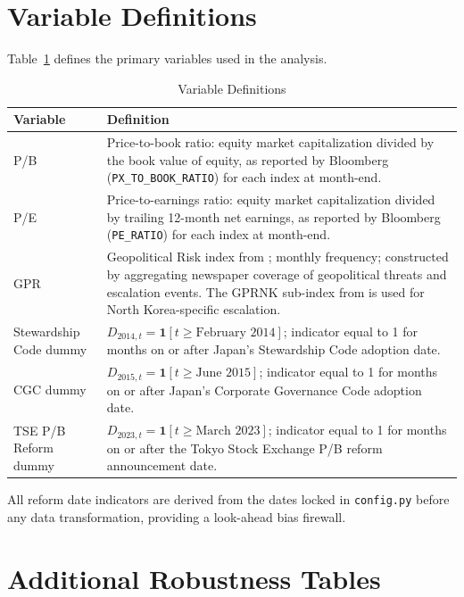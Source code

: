\documentclass[12pt]{article}
\begin{document}
\begin{appendices}

\section{Variable Definitions}
\label{app:vardefs}

Table~\ref{tab:vardefs} defines the primary variables used in the analysis.

\begin{table}[htbp]
\centering
\caption{Variable Definitions}
\label{tab:vardefs}
\begin{tabular}{lp{10cm}}
\toprule
Variable & Definition \\
\midrule
P/B & Price-to-book ratio: equity market capitalization divided by the book value of equity,
  as reported by Bloomberg (\texttt{PX\_TO\_BOOK\_RATIO}) for each index at month-end. \\
P/E & Price-to-earnings ratio: equity market capitalization divided by trailing 12-month net
  earnings, as reported by Bloomberg (\texttt{PE\_RATIO}) for each index at month-end. \\
GPR & Geopolitical Risk index from \citet{caldara2022}; monthly frequency; constructed by
  aggregating newspaper coverage of geopolitical threats and escalation events. The GPRNK
  sub-index from \citet{imf2021} is used for North Korea-specific escalation. \\
Stewardship Code dummy & $D_{2014,t} = \mathbf{1}[t \geq \text{February 2014}]$; indicator
  equal to 1 for months on or after Japan's Stewardship Code adoption date. \\
CGC dummy & $D_{2015,t} = \mathbf{1}[t \geq \text{June 2015}]$; indicator equal to 1 for
  months on or after Japan's Corporate Governance Code adoption date. \\
TSE P/B Reform dummy & $D_{2023,t} = \mathbf{1}[t \geq \text{March 2023}]$; indicator equal
  to 1 for months on or after the Tokyo Stock Exchange P/B reform announcement date. \\
\bottomrule
\end{tabular}
\end{table}

All reform date indicators are derived from the dates locked in \texttt{config.py} before
any data transformation, providing a look-ahead bias firewall.

\section{Additional Robustness Tables}
\label{app:robustness}


\end{appendices}
\end{document}
